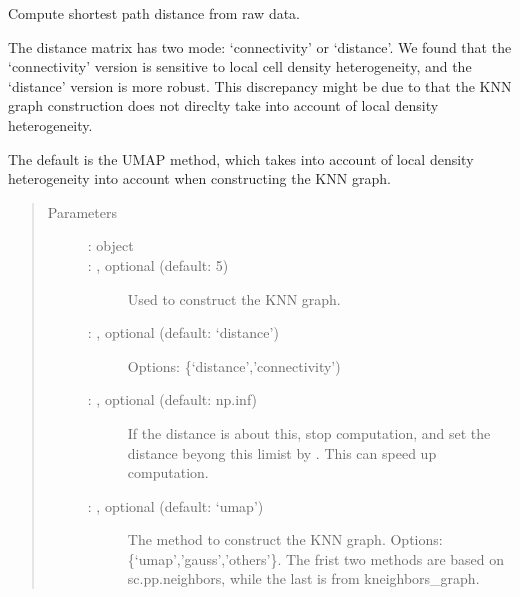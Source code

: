 \documentclass[letterpaper,10pt,english]{sphinxmanual}
\begin{document}
\begin{fulllineitems}
\label{\detokenize{cospar.hf.compute_shortest_path_distance:cospar.hf.compute_shortest_path_distance}}
Compute shortest path distance from raw data.

The distance matrix has two mode: ‘connectivity’ or ‘distance’.
We found that the ‘connectivity’ version is sensitive to local cell
density heterogeneity, and the ‘distance’ version is more robust.
This discrepancy might be due to that the KNN graph construction does not
direclty take into account of local density heterogeneity.

The default is the UMAP method, which takes into account of local
density heterogeneity into account when constructing the KNN graph.
\begin{quote}\begin{description}
\item[{Parameters}] \leavevmode\begin{description}
\item[{ :  object}] \leavevmode


\item[{ : , optional (default: 5)}] \leavevmode
Used to construct the KNN graph.

\item[{ : , optional (default: ‘distance’)}] \leavevmode
Options: \{‘distance’,’connectivity’)

\item[{ : , optional (default: np.inf)}] \leavevmode
If the distance is about this, stop computation, and set
the distance beyong this limist by . This can speed up computation.

\item[{ : , optional (default: ‘umap’)}] \leavevmode
The method to construct the KNN graph. Options: \{‘umap’,’gauss’,’others’\}.
The frist two methods are based on sc.pp.neighbors, while the last is from
kneighbors\_graph.


\end{description}
\end{description}
\end{quote}
\end{fulllineitems}
\end{document}
